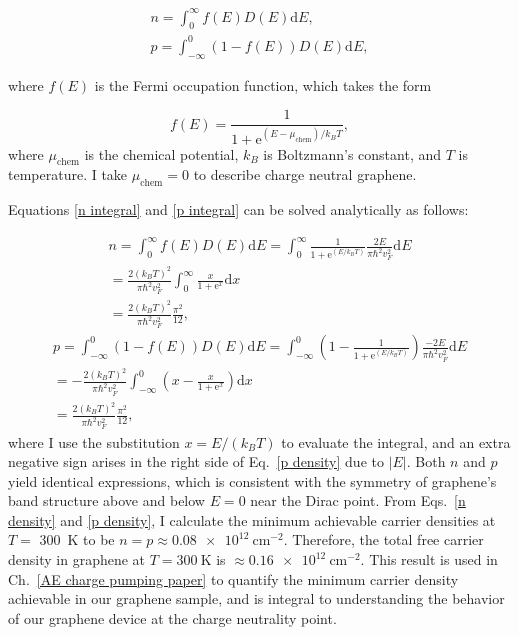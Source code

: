 \documentclass[double,12pt,1in,seploa]{beavtex}
\begin{document}
\begin{gather}
        n = \int_{0}^{\infty}f(E) D(E)\mathrm{d}E, \label{n integral} \\ 
        p = \int_{-\infty}^{0}(1- f(E)) D(E)\mathrm{d}E, \label{p integral}
\end{gather}

where $f(E)$ is the Fermi occupation function, which takes the form

\begin{equation}
    f(E) = \frac{1}{1+\mathrm{e}^{(E-\mu_{\mathrm{chem}})/k_B T}},
\end{equation}
where $\mu_{\mathrm{chem}}$ is the chemical potential, $k_B$ is Boltzmann's constant, and $T$ is temperature. I take $\mu_{\mathrm{chem}} = 0$ to describe charge neutral graphene. 

Equations \ref{n integral} and \ref{p integral} can be solved analytically as follows:

\begin{equation}
    \begin{split}
        n = \int_{0}^{\infty}f(E) D(E)\mathrm{d}E 
        = \int_{0}^{\infty}\frac{1}{1+\mathrm{e}^{(E/k_B T)}} \frac{2E}{\pi \hbar^2 v_F^2}\mathrm{d}E \\
        = \frac{2(k_B T)^2}{\pi \hbar^2 v_F^2}\int_{0}^{\infty}\frac{x}{1+\mathrm{e}^{x}}\mathrm{d}x \\
        = \frac{2(k_B T)^2}{\pi\hbar^2 v_F^2} \frac{\pi^2}{12}, \label{n density}
    \end{split}
\end{equation}
\begin{equation}
    \begin{split}
        p = \int_{-\infty}^{0}(1-f(E)) D(E)\mathrm{d}E 
        = \int_{-\infty}^{0}\left( 1 -\frac{1}{1+\mathrm{e}^{(E/k_B T)}} \right) \frac{-2E}{\pi \hbar^2 v_F^2}\mathrm{d}E \\
        = -\frac{2(k_B T)^2}{\pi \hbar^2 v_F^2}\int_{-\infty}^{0}\left(x - \frac{x}{1+\mathrm{e}^{x}}\right)\mathrm{d}x \\
        = \frac{2(k_B T)^2}{\pi\hbar^2 v_F^2} \frac{\pi^2}{12}, \label{p density}
    \end{split}
\end{equation}
where I use the substitution $x = E/(k_B T)$ to evaluate the integral, and an extra negative sign arises in the right side of Eq.\ \ref{p density} due to $|E|$. Both $n$ and $p$ yield identical expressions, which is consistent with the symmetry of graphene's band structure above and below $E = 0$ near the Dirac point. From Eqs.\ \ref{n density} and \ref{p density}, I calculate the minimum achievable carrier densities at $T = $ \SI{300}{\kelvin} to be $n = p \approx \SI{0.08e12}{\centi\meter^{-2}}$. Therefore, the total free carrier density in graphene at $T =  \SI{300}{\kelvin}$ is $\approx \SI{0.16e12}{\centi\meter^{-2}}$. This result is used in Ch.\ \ref{AE charge pumping paper} to quantify the minimum carrier density achievable in our graphene sample, and is integral to understanding the behavior of our graphene device at the charge neutrality point.
\end{document}
